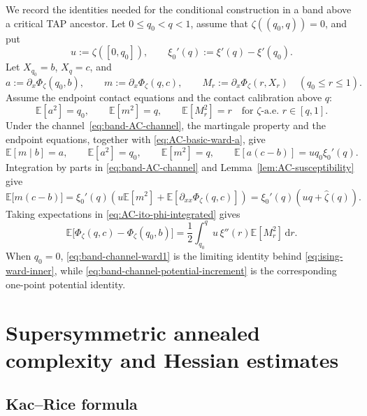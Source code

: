 \documentclass[a4paper,10pt,reqno]{amsart}
\numberwithin{equation}{section}
\newcommand{\dE}{\mathbb{E}}%
\newcommand{\dd}{\mathrm{d}}
\begin{document}
	We record the identities needed for the conditional construction in a band
	above a critical TAP ancestor. Let \(0\le q_0<q<1\), assume that
	\(\zeta((q_0,q))=0\), and put
	\[
	u:=\zeta([0,q_0]),
	\qquad
	\xi_0'(q):=\xi'(q)-\xi'(q_0).
	\]
	Let $X_{q_0}=b$, $X_q=c$, and
	\[
	a:=\partial_x\Phi_\zeta(q_0,b),
	\qquad
	m:=\partial_x\Phi_\zeta(q,c),
	\qquad
	M_r:=\partial_x\Phi_\zeta(r,X_r)\quad(q_0\le r\le1).
	\]
	Assume the endpoint contact equations and the contact calibration above \(q\):
	\[
	\dE[a^2]=q_0,
	\qquad
	\dE[m^2]=q,
	\qquad
	\dE[M_r^2]=r
	\quad\text{for \(\zeta\)-a.e.\ \(r\in[q,1]\)}.
	\]
	Under the channel~\eqref{eq:band-AC-channel}, the martingale property and
	the endpoint equations, together with \eqref{eq:AC-basic-ward-a}, give
	\begin{equation}\label{eq:band-channel-self-overlap}
		\dE[m\mid b]=a,
		\qquad
		\dE[a^2]=q_0,
		\qquad
		\dE[m^2]=q,
		\qquad
		\dE[a(c-b)]=u q_0\xi_0'(q).
	\end{equation}
	Integration by parts in \eqref{eq:band-AC-channel} and
	Lemma~\ref{lem:AC-susceptibility} give
	\begin{equation}\label{eq:band-channel-ward1}
		\dE\bigl[m(c-b)\bigr]
		=\xi_0'(q)\left(
		u\dE[m^2]
		+\dE\left[\partial_{xx}\Phi_\zeta(q,c)\right]
		\right)
		=\xi_0'(q)\left(uq+\widehat\zeta(q)\right).
	\end{equation}
	Taking expectations in \eqref{eq:AC-ito-phi-integrated} gives
	\begin{equation}\label{eq:band-channel-potential-increment}
		\dE\bigl[\Phi_\zeta(q,c)-\Phi_\zeta(q_0,b)\bigr]
		=\frac12\int_{q_0}^q u\,\xi''(r)\dE[M_r^2]\,\dd r .
	\end{equation}
	When \(q_0=0\), \eqref{eq:band-channel-ward1} is the limiting identity
	behind \eqref{eq:ising-ward-inner}, while
	\eqref{eq:band-channel-potential-increment} is the corresponding
	one-point potential identity.
	
	\section{Supersymmetric annealed complexity and Hessian estimates}
	\label{sec:one-point-susy-computations}
	
	\subsection{Kac--Rice formula}
	
\end{document}

